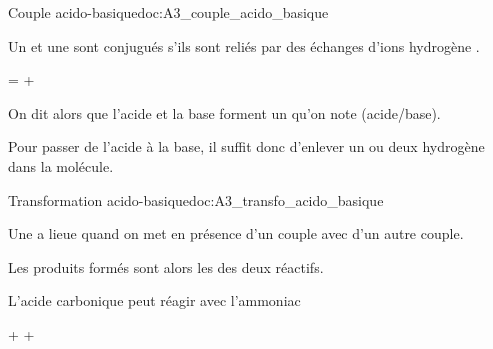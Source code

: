 \begin{doc}{Couple acido-basique}{doc:A3_couple_acido_basique}
  \begin{importants}
    Un  et une  sont conjugués s'ils sont reliés par des échanges d'ions hydrogène .
    \begin{center}
       =  + 
    \end{center}
    On dit alors que l'acide et la base forment un  qu'on note  (acide/base).
  \end{importants}

  \attention Pour passer de l'acide à la base, il suffit donc d'enlever un ou deux hydrogène dans la molécule.
\end{doc}


\begin{doc}{Transformation acido-basique}{doc:A3_transfo_acido_basique}
  \begin{importants}
    Une  a lieue quand on met en présence  d'un couple avec  d'un autre couple.

    Les produits formés sont alors les  des deux réactifs.
  \end{importants}

  \exemple L'acide carbonique  peut réagir avec l'ammoniac 
  \begin{center}
     +  \reaction {} + 
  \end{center}
\end{doc}

